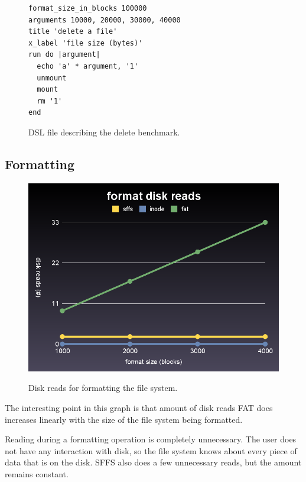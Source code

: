 \documentclass[10pt,twocolumn]{article}
\begin{document}
\begin{figure}[h]
  \begin{center}
    \begin{verbatim}format_size_in_blocks 100000
arguments 10000, 20000, 30000, 40000
title 'delete a file'
x_label 'file size (bytes)'
run do |argument|
  echo 'a' * argument, '1'
  unmount
  mount
  rm '1'
end\end{verbatim}
    \label{code:delete}
    \caption{DSL file describing the delete benchmark.}
  \end{center}
\end{figure}

  \subsection{Formatting}
  \begin{figure}[h]
    \begin{center}
      \includegraphics[scale=0.2]{../graphs/format_reads.png}
      \label{fig:delete_seeks}
      \caption{Disk reads for formatting the file system.}
    \end{center}
  \end{figure}

  The interesting point in this graph is that amount of disk reads FAT does 
  increases linearly with the size of the file system being formatted.

  Reading during a formatting operation is completely unnecessary. The user 
  does not have any interaction with disk, so the file system knows about every 
  piece of data that is on the disk. SFFS also does a few unnecessary reads, 
  but the amount remains constant.
\end{document}
